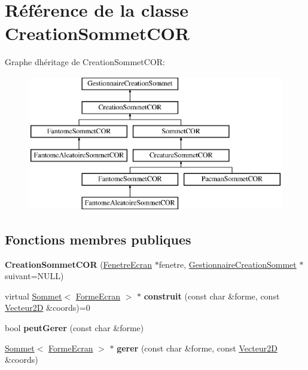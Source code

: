 \hypertarget{class_creation_sommet_c_o_r}{}\section{Référence de la classe Creation\+Sommet\+C\+OR}
\label{class_creation_sommet_c_o_r}
Graphe d\textquotesingle{}héritage de Creation\+Sommet\+C\+OR\+:\begin{figure}[H]
\begin{center}
\leavevmode
\includegraphics[height=5.925926cm]{class_creation_sommet_c_o_r}
\end{center}
\end{figure}
\subsection*{Fonctions membres publiques}
\begin{DoxyCompactItemize}
\item 
\mbox{\label{class_creation_sommet_c_o_r_adb8f3a5c991e1e662614edc54534b834}} 
{\bfseries Creation\+Sommet\+C\+OR} (\mbox{\hyperlink{class_fenetre_ecran}{Fenetre\+Ecran}} $\ast$fenetre, \mbox{\hyperlink{class_gestionnaire_creation_sommet}{Gestionnaire\+Creation\+Sommet}} $\ast$suivant=N\+U\+LL)
\item 
\mbox{\label{class_creation_sommet_c_o_r_a181e0a469697ffa27a1167e0f01a5042}} 
virtual \mbox{\hyperlink{class_sommet}{Sommet}}$<$ \mbox{\hyperlink{class_forme_ecran}{Forme\+Ecran}} $>$ $\ast$ {\bfseries construit} (const char \&forme, const \mbox{\hyperlink{class_vecteur2_d}{Vecteur2D}} \&coords)=0
\item 
\mbox{\label{class_creation_sommet_c_o_r_abf87376fe26e8cff6dac0e4c6b26ad68}} 
bool {\bfseries peut\+Gerer} (const char \&forme)
\item 
\mbox{\label{class_creation_sommet_c_o_r_aa45a97cc325fb01552631e35d333ffd9}} 
\mbox{\hyperlink{class_sommet}{Sommet}}$<$ \mbox{\hyperlink{class_forme_ecran}{Forme\+Ecran}} $>$ $\ast$ {\bfseries gerer} (const char \&forme, const \mbox{\hyperlink{class_vecteur2_d}{Vecteur2D}} \&coords)
\end{DoxyCompactItemize}
